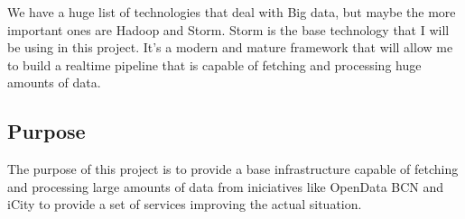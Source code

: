 We have a huge list of technologies that deal with Big data, but maybe the more
important ones are Hadoop and Storm. Storm is the base technology that I will be
using in this project. It's a modern and mature framework that will allow me to
build a realtime pipeline that is capable of fetching and processing huge
amounts of data.

\subsection{Purpose}

The purpose of this project is to provide a base infrastructure capable of
fetching and processing large amounts of data from iniciatives like OpenData
BCN and iCity to provide a set of services improving the actual situation.
